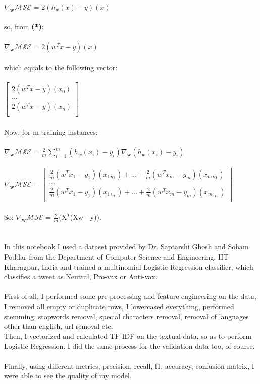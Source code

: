 \documentclass{article}
\begin{document}
$\nabla_{\!\mathbf{w}}\mathcal{MSE} $ = $2(h_w(x) - y)$$(x)$ \\ \\ 
so, from \textbf{(*)}:\\ \\
$\nabla_{\!\mathbf{w}}\mathcal{MSE} $ = $2(w^Tx - y)$$(x)$   \\ \\ 
which equals to the following vector: \\ \\
$
\begin{bmatrix}
2(w^Tx - y)(x_0)\\
. . .\\             
2(w^Tx - y)(x_n)\\
\end{bmatrix}
$ \\ \\
Now, for m training instances: \\ \\ 
$\nabla_{\!\mathbf{w}}\mathcal{MSE} $ = $\frac{2}{m}\sum_{i=1}^{m}(h_w(x_i) - y_i)\nabla_{\!\mathbf{w}}$$(h_w(x_i) - y_i)$ \\ \\
$\nabla_{\!\mathbf{w}}\mathcal{MSE} $ = $\begin{bmatrix}
\frac{2}{m}(w^Tx_1 - y_1)(x_1,_0) + ... + \frac{2}{m}(w^Tx_m - y_m)(x_m,_0) \\
. . .\\             
\frac{2}{m}(w^Tx_1 - y_1)(x_1,_n) + ... + \frac{2}{m}(w^Tx_m - y_m)(x_m,_n)\\
\end{bmatrix}
$ \\ \\ 
So: $\nabla_{\!\mathbf{w}}\mathcal{MSE} $ = $\frac{2}{m}$(X$^T$(Xw - y)).
\section{}
In this notebook I used a dataset provided by Dr. Saptarshi Ghosh and Soham Poddar from the Department of Computer Science and Engineering, IIT Kharagpur, India and trained a multinomial Logistic Regression classifier, which classifies a tweet as Neutral, Pro-vax or Anti-vax.
\\ \\
First of all, I performed some pre-processing and feature engineering on the data, I removed all empty or duplicate rows, I lowercased everything, performed stemming, stopwords removal, special characters removal, removal of languages other than english, url removal etc.
\\
Then, I vectorized and calculated TF-IDF on the textual data, so as to perform Logistic Regression. I did the same process for the validation data too, of course.
\\ \\
Finally, using different metrics, precision, recall, f1, accuracy, confusion matrix, I were able to see the quality of my model.
\end{document}
